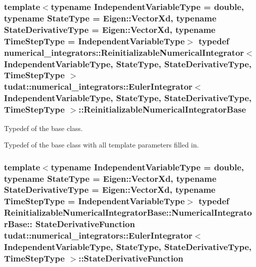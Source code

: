 \subsubsection[{\texorpdfstring{Reinitializable\+Numerical\+Integrator\+Base}{ReinitializableNumericalIntegratorBase}}]{\setlength{\rightskip}{0pt plus 5cm}template$<$typename Independent\+Variable\+Type  = double, typename State\+Type  = Eigen\+::\+Vector\+Xd, typename State\+Derivative\+Type  = Eigen\+::\+Vector\+Xd, typename Time\+Step\+Type  = Independent\+Variable\+Type$>$ typedef {\bf numerical\+\_\+integrators\+::\+Reinitializable\+Numerical\+Integrator}$<$ Independent\+Variable\+Type, State\+Type, State\+Derivative\+Type, Time\+Step\+Type $>$ {\bf tudat\+::numerical\+\_\+integrators\+::\+Euler\+Integrator}$<$ Independent\+Variable\+Type, State\+Type, State\+Derivative\+Type, Time\+Step\+Type $>$\+::{\bf Reinitializable\+Numerical\+Integrator\+Base}}\hypertarget{classtudat_1_1numerical__integrators_1_1EulerIntegrator_a2c8237c92c141983162d39a002ede599}{}\label{classtudat_1_1numerical__integrators_1_1EulerIntegrator_a2c8237c92c141983162d39a002ede599}


Typedef of the base class. 

Typedef of the base class with all template parameters filled in. 
\subsubsection[{\texorpdfstring{State\+Derivative\+Function}{StateDerivativeFunction}}]{\setlength{\rightskip}{0pt plus 5cm}template$<$typename Independent\+Variable\+Type  = double, typename State\+Type  = Eigen\+::\+Vector\+Xd, typename State\+Derivative\+Type  = Eigen\+::\+Vector\+Xd, typename Time\+Step\+Type  = Independent\+Variable\+Type$>$ typedef Reinitializable\+Numerical\+Integrator\+Base\+::\+Numerical\+Integrator\+Base\+:: {\bf State\+Derivative\+Function} {\bf tudat\+::numerical\+\_\+integrators\+::\+Euler\+Integrator}$<$ Independent\+Variable\+Type, State\+Type, State\+Derivative\+Type, Time\+Step\+Type $>$\+::{\bf State\+Derivative\+Function}}\hypertarget{classtudat_1_1numerical__integrators_1_1EulerIntegrator_a868c812e8c32d247e52ca0800c6db198}{}\label{classtudat_1_1numerical__integrators_1_1EulerIntegrator_a868c812e8c32d247e52ca0800c6db198}


